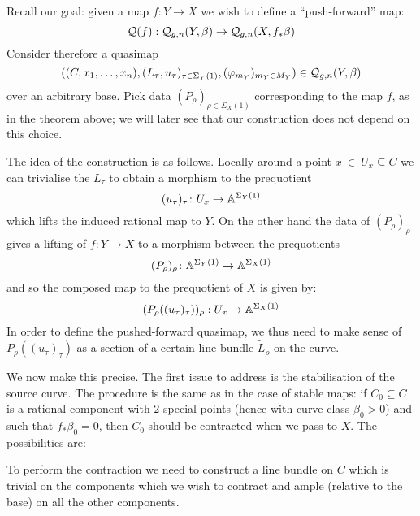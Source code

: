 Recall our goal: given a map $f \colon Y \to X$ we wish to define a ``push-forward'' map:
\begin{equation*} \mathcal{Q}(f) : \mathcal{Q}_{g,n}(Y,\beta) \rightarrow \mathcal{Q}_{g,n}(X,f_*\beta) \end{equation*}
Consider therefore a quasimap
\begin{equation*} ((C,x_1,\ldots,x_n), (L_\tau, u_\tau)_{\tau \in \Sigma_Y(1)}, (\varphi_{m_Y})_{m_Y \in M_Y}) \in \mathcal{Q}_{g,n}(Y,\beta) \end{equation*}
over an arbitrary base. Pick data $(P_\rho)_{\rho \in \Sigma_X(1)}$ corresponding to the map $f$, as in the theorem above; we will later see that our construction does not depend on this choice.

The idea of the construction is as follows. Locally around a point $x~\in~U_x \subseteq C$ we can trivialise the $L_\tau$ to obtain a morphism to the prequotient
\begin{equation*} (u_\tau)_\tau \colon U_x \rightarrow \mathbb{A}^{\Sigma_Y(1)} \end{equation*}
which lifts the induced rational map to $Y$. On the other hand the data of $(P_\rho)_\rho$ gives a lifting of $f\colon Y\to X$ to a morphism between the prequotients
\begin{equation*}(P_\rho)_\rho \colon \mathbb{A}^{\Sigma_Y(1)} \rightarrow \mathbb{A}^{\Sigma_X(1)}\end{equation*}
and so the composed map to the prequotient of $X$ is given by:
\begin{equation*} (P_\rho((u_\tau)_\tau))_\rho : U_x \rightarrow \mathbb{A}^{\Sigma_X(1)} \end{equation*}
In order to define the pushed-forward quasimap, we thus need to make sense of $P_\rho((u_\tau)_\tau)$ as a section of a certain line bundle $\tilde{L}_\rho$ on the curve.

We now make this precise. The first issue to address is the stabilisation of the source curve. The procedure is the same as in the case of stable maps: if $C_0 \subseteq C$ is a rational component with $2$ special points (hence with curve class $\beta_0 > 0$) and such that $f_* \beta_0 = 0$, then $C_0$ should be contracted when we pass to $X$. The possibilities are:

\begin{center}
\end{center}
To perform the contraction we need to construct a line bundle on $C$ which is trivial on the components which we wish to contract and ample (relative to the base) on all the other components.

